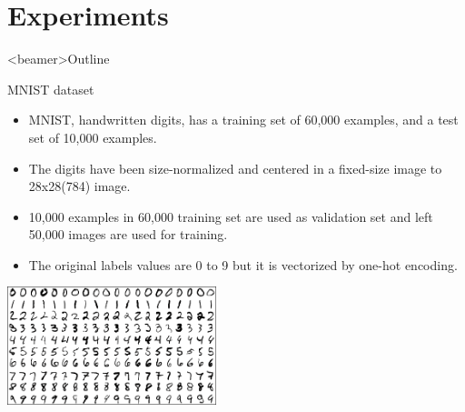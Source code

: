 \section{Experiments}
\begin{frame}<beamer>{Outline}
  \end{frame}
    \begin{frame}{MNIST dataset}
      \begin{itemize}
      \item {MNIST, handwritten digits, has a training set of 60,000 examples, and a test set of 10,000 examples.}
      \item {The digits have been size-normalized and centered in a fixed-size image to 28x28(784) image. }
      \item {10,000 examples in 60,000 training set are used as validation set and left 50,000 images are used for training.}
      \item {The original labels values are 0 to 9 but it is vectorized by one-hot encoding.}
      \end{itemize}
      \begin{center}
    \includegraphics[width=2.4in]{mnist.png}
      \end{center}
    \end{frame}
    
